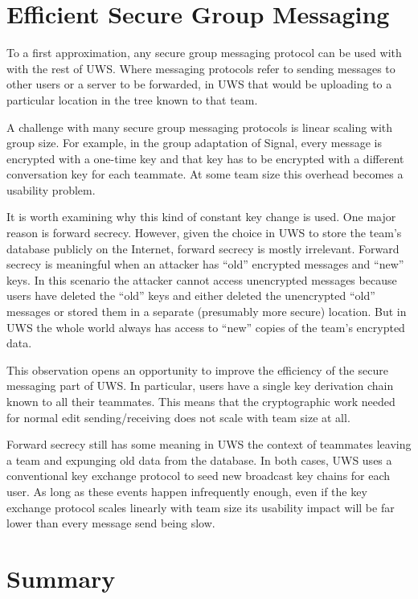 \documentclass[runningheads]{llncs}
\begin{document}

\section{Efficient Secure Group Messaging}

To a first approximation, any secure group messaging protocol can be used with with the rest of UWS.
Where messaging protocols refer to sending messages to other users or a server to be forwarded, in UWS that would be uploading to a particular location in the tree known to that team.

A challenge with many secure group messaging protocols is linear scaling with group size.
For example, in the group adaptation of Signal, every message is encrypted with a one-time key and that key has to be encrypted with a different conversation key for each teammate.
At some team size this overhead becomes a usability problem.

It is worth examining why this kind of constant key change is used.
One major reason is forward secrecy.
However, given the choice in UWS to store the team's database publicly on the Internet, forward secrecy is mostly irrelevant.
Forward secrecy is meaningful when an attacker has ``old'' encrypted messages and ``new'' keys.
In this scenario the attacker cannot access unencrypted messages because users have deleted the ``old'' keys and either deleted the unencrypted ``old'' messages or stored them in a separate (presumably more secure) location.
But in UWS the whole world always has access to ``new'' copies of the team's encrypted data.

This observation opens an opportunity to improve the efficiency of the secure messaging part of UWS.
In particular, users have a single key derivation chain known to all their teammates.
This means that the cryptographic work needed for normal edit sending{\slash}receiving does not scale with team size at all.

Forward secrecy still has some meaning in UWS the context of teammates leaving a team and expunging old data from the database.
In both cases, UWS uses a conventional key exchange protocol to seed new broadcast key chains for each user.
As long as these events happen infrequently enough, even if the key exchange protocol scales linearly with team size its usability impact will be far lower than every message send being slow.

\section{Summary}
\end{document}
